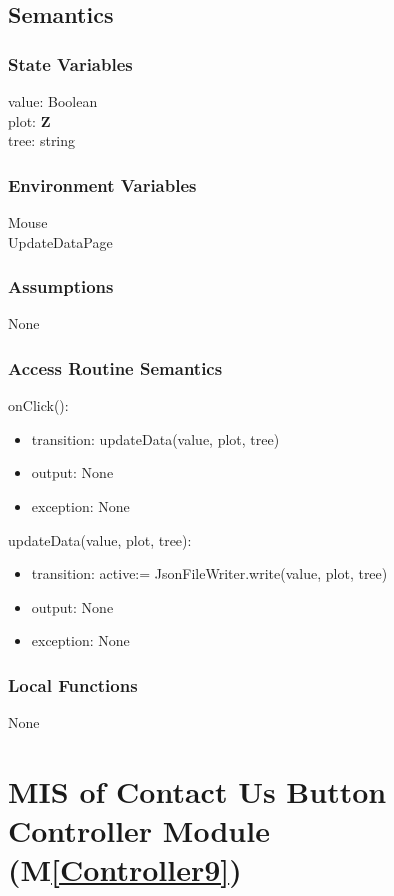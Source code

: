 \documentclass[12pt, titlepage]{article}
\newcommand{\mref}[1]{M\ref{#1}}
\begin{document}
\subsection{Semantics}

\subsubsection{State Variables}
value: Boolean\\
plot: $\mathbf{Z}$\\
tree: string

\subsubsection{Environment Variables}

Mouse\\
UpdateDataPage

\subsubsection{Assumptions}
None
\subsubsection{Access Routine Semantics}

\noindent onClick():
\begin{itemize}
\item transition: updateData(value, plot, tree)
\item output: None
\item exception: None
\end{itemize}

\noindent updateData(value, plot, tree):
\begin{itemize}
\item transition: active:= JsonFileWriter.write(value, plot, tree)
\item output: None
\item exception: None
\end{itemize}

\subsubsection{Local Functions}
None

\newpage  

\section{MIS of Contact Us Button Controller Module (\mref{Controller9})}
\end{document}
